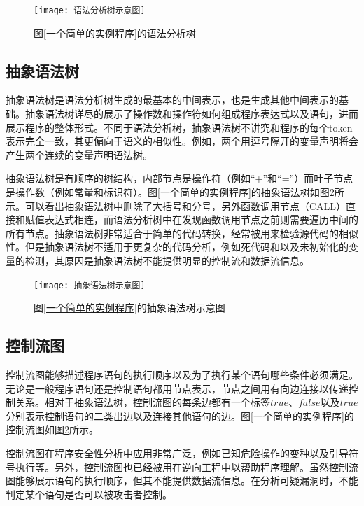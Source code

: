 \begin{figure}[htp]
\centering
\texttt{[image: 语法分析树示意图]}
\caption{图\ref{一个简单的实例程序}的语法分析树}
\label{语法分析树示例}
\end{figure}

\subsection{抽象语法树}

抽象语法树是语法分析树生成的最基本的中间表示，也是生成其他中间表示的基础。抽象语法树详尽的展示了操作数和操作符如何组成程序表达式以及语句，进而展示程序的整体形式。不同于语法分析树，抽象语法树不讲究和程序的每个token表示完全一致，其更偏向于语义的相似性。例如，两个用逗号隔开的变量声明将会产生两个连续的变量声明语法树。

抽象语法树是有顺序的树结构，内部节点是操作符（例如“+”和“=”）而叶子节点是操作数（例如常量和标识符）。图\ref{一个简单的实例程序}的抽象语法树如图\ref{抽象语法树示意图}所示。可以看出抽象语法树中删除了大括号和分号，另外函数调用节点{（CALL）}直接和赋值表达式相连，而语法分析树中在发现函数调用节点之前则需要遍历中间的所有节点。抽象语法树非常适合于简单的代码转换，经常被用来检验源代码的相似性。但是抽象语法树不适用于更复杂的代码分析，例如死代码和以及未初始化的变量的检测，其原因是抽象语法树不能提供明显的控制流和数据流信息。


\begin{figure}[htp]
\centering
\texttt{[image: 抽象语法树示意图]}
\caption{图\ref{一个简单的实例程序}的抽象语法树示意图}
\label{抽象语法树示意图}
\end{figure}

\subsection{控制流图}

控制流图能够描述程序语句的执行顺序以及为了执行某个语句哪些条件必须满足。无论是一般程序语句还是控制语句都用节点表示，节点之间用有向边连接以传递控制关系。相对于抽象语法树，控制流图的每条边都有一个标签$true$、$false$以及$true$分别表示控制语句的二类出边以及连接其他语句的边。图\ref{一个简单的实例程序}的控制流图如图\ref{抽象语法树示意图}所示。

控制流图在程序安全性分析中应用非常广泛，例如已知危险操作的变种以及引导符号执行等。另外，控制流图也已经被用在逆向工程中以帮助程序理解。虽然控制流图能够展示语句的执行顺序，但其不能提供数据流信息。在分析可疑漏洞时，不能判定某个语句是否可以被攻击者控制。

